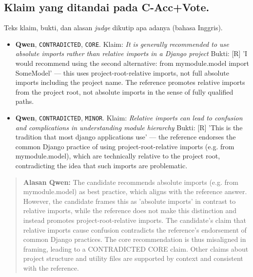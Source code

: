 \subsection{Klaim yang ditandai pada C-Acc+Vote.} Teks klaim, bukti, dan alasan \emph{judge} dikutip apa adanya (bahasa Inggris).
\begin{itemize}\small
\item \textbf{Qwen}, \texttt{CONTRADICTED}, \texttt{CORE}. Klaim: \emph{It is generally recommended to use absolute imports rather than relative imports in a Django project} Bukti: [R] 'I would recommend using the second alternative: from mymodule.model import SomeModel' — this uses project-root-relative imports, not full absolute imports including the project name. The reference promotes relative imports from the project root, not absolute imports in the sense of fully qualified paths.
\item \textbf{Qwen}, \texttt{CONTRADICTED}, \texttt{MINOR}. Klaim: \emph{Relative imports can lead to confusion and complications in understanding module hierarchy} Bukti: [R] 'This is the tradition that most django applications use' — the reference endorses the common Django practice of using project-root-relative imports (e.g. from mymodule.model), which are technically relative to the project root, contradicting the idea that such imports are problematic.
\end{itemize}
\begin{quote}\small\textbf{Alasan Qwen:} The candidate recommends absolute imports (e.g. from mymodule.model) as best practice, which aligns with the reference answer. However, the candidate frames this as 'absolute imports' in contrast to relative imports, while the reference does not make this distinction and instead promotes project-root-relative imports. The candidate's claim that relative imports cause confusion contradicts the reference's endorsement of common Django practices. The core recommendation is thus misaligned in framing, leading to a CONTRADICTED CORE claim. Other claims about project structure and utility files are supported by context and consistent with the reference.\end{quote}
